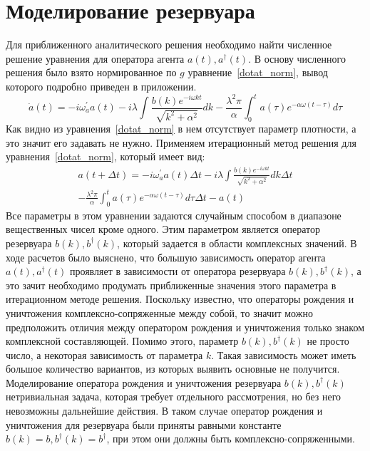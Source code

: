 \section{Моделирование резервуара}

Для приближенного аналитического решения необходимо найти численное решение уравнения для оператора
агента $a(t), a^{\dagger}(t)$.
В основу численного решения было взято нормированное по $g$ уравнение~\eqref{dotat_norm}, вывод которого
подробно приведен в приложении.
\begin{equation}\label{dotat_norm}
    \dot{a}(t) =
    -i \omega^{'}_{a} a(t)
    -i \lambda \int \frac{b(k)e^{-i \omega k t}}{\sqrt{k^{2} + \alpha^2}} dk
    -\frac{\lambda^{2} \pi}{\alpha} \int_{0}^{t} a(\tau) e^{- \alpha \omega (t - \tau)} d\tau
\end{equation}
Как видно из уравнения~\eqref{dotat_norm} в нем отсутствует параметр плотности, а это значит его
задавать не нужно.
Применяем итерационный метод решения для уравнения~\eqref{dotat_norm}, который имеет вид:
\begin{multline}
    a(t + \Delta t) =
    -i \omega^{'}_{a} a(t) \Delta t
    -i \lambda \int \frac{b(k)e^{-i \omega k t}}{\sqrt{k^{2} + \alpha^2}} dk \Delta t \\
    -\frac{\lambda^{2} \pi}{\alpha} \int_{0}^{t} a(\tau) e^{- \alpha \omega (t - \tau)} d\tau \Delta t
    - a(t)
\end{multline}
Все параметры в этом уравнении задаются случайным способом в диапазоне вещественных чисел кроме одного.
Этим параметром является оператор резервуара $b(k), b^{\dagger}(k)$, который задается в области
комплексных значений.
В ходе расчетов было выяснено, что большую зависимость оператор агента $a(t), a^{\dagger}(t)$ проявляет
в зависимости от оператора резервуара $b(k), b^{\dagger}(k)$, а это зачит необходимо продумать
приближенные значения этого параметра в итерационном методе решения.
Поскольку известно, что операторы рождения и уничтожения комплексно-сопряженные между собой, то значит
можно предположить отличия между оператором рождения и уничтожения только знаком комплексной составляющей.
Помимо этого, параметр $b(k), b^{\dagger}(k)$ не просто число, а некоторая зависимость от параметра $k$.
Такая зависимость может иметь большое количество вариантов, из которых выявить основные не получится.
Моделирование оператора рождения и уничтожения резервуара $b(k), b^{\dagger}(k)$ нетривиальная задача,
которая требует отдельного рассмотрения, но без него невозможны дальнейшие действия.
В таком случае оператор рождения и уничтожения для резервуара были приняты равными константе
$b(k) = b, b^{\dagger}(k) = b^{\dagger}$, при этом они должны быть комплексно-сопряженными.

